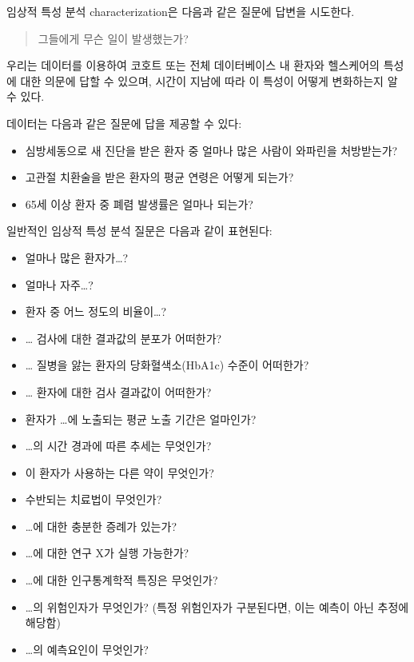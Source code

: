 \documentclass[10.5pt]{book}
\providecommand{\tightlist}{%
  \setlength{\itemsep}{0pt}\setlength{\parskip}{0pt}}
\theoremstyle{definition}
\theoremstyle{definition}
\theoremstyle{definition}
\theoremstyle{remark}
\begin{document}

임상적 특성 분석 characterization은 다음과 같은 질문에 답변을 시도한다.

\begin{quote}
그들에게 무슨 일이 발생했는가?
\end{quote}

우리는 데이터를 이용하여 코호트 또는 전체 데이터베이스 내 환자와
헬스케어의 특성에 대한 의문에 답할 수 있으며, 시간이 지남에 따라 이
특성이 어떻게 변화하는지 알 수 있다.

데이터는 다음과 같은 질문에 답을 제공할 수 있다:

\begin{itemize}
\tightlist
\item
  심방세동으로 새 진단을 받은 환자 중 얼마나 많은 사람이 와파린을
  처방받는가?
\item
  고관절 치환술을 받은 환자의 평균 연령은 어떻게 되는가?
\item
  65세 이상 환자 중 폐렴 발생률은 얼마나 되는가?
\end{itemize}

일반적인 임상적 특성 분석 질문은 다음과 같이 표현된다:

\begin{itemize}
\tightlist
\item
  얼마나 많은 환자가\ldots{}?
\item
  얼마나 자주\ldots{}?
\item
  환자 중 어느 정도의 비율이\ldots{}?
\item
  \ldots{} 검사에 대한 결과값의 분포가 어떠한가?
\item
  \ldots{} 질병을 앓는 환자의 당화혈색소(HbA1c) 수준이 어떠한가?
\item
  \ldots{} 환자에 대한 검사 결과값이 어떠한가?
\item
  환자가 \ldots{}에 노출되는 평균 노출 기간은 얼마인가?
\item
  \ldots{}의 시간 경과에 따른 추세는 무엇인가?
\item
  이 환자가 사용하는 다른 약이 무엇인가?
\item
  수반되는 치료법이 무엇인가?
\item
  \ldots{}에 대한 충분한 증례가 있는가?
\item
  \ldots{}에 대한 연구 X가 실행 가능한가?
\item
  \ldots{}에 대한 인구통계학적 특징은 무엇인가?
\item
  \ldots{}의 위험인자가 무엇인가? (특정 위험인자가 구분된다면, 이는
  예측이 아닌 추정에 해당함)
\item
  \ldots{}의 예측요인이 무엇인가?
\end{itemize}
\end{document}
